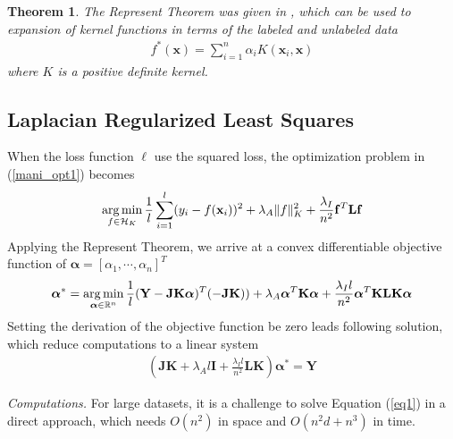 \documentclass{article}
\newcommand{\argmin}{\operatornamewithlimits{arg\,min}}
\newtheorem{theorem}{Theorem}
\begin{document}
\begin{theorem}
The Represent Theorem was given in \cite{belkin2006manifold}, which can be used to expansion of kernel functions in terms of the labeled and unlabeled data
\begin{align}\label{represent}
f^\ast(\mathbf{x})=\sum_{i=1}^n \alpha_i K(\mathbf{x}_i, \mathbf{x})
\end{align}
where $K$ is a positive definite kernel.
\end{theorem}

\subsection{Laplacian Regularized Least Squares}
When the loss function $\ell$ use the squared loss, the optimization problem in (\ref{mani_opt1}) becomes
\begin{align}\label{mani_opt2}
\argmin \limits_{f \in \mathcal{H}_K}
\frac{1}{l} \sum_{i=1}^l (y_i-f(\mathbf{x}_i))^2
+\lambda_A\|f\|_K^2
+\frac{\lambda_I }{n^2} \mathbf{f}^T \mathbf{L} \mathbf{f}
\end{align}
Applying the Represent Theorem, we arrive at a convex differentiable objective function of $\boldsymbol{\alpha}=[\alpha_1, \cdots, \alpha_n]^T$
\begin{align*}
\boldsymbol{\alpha}^\ast=\argmin \limits_{\boldsymbol{\alpha} \in \mathbb{R}^n}
\frac{1}{l} (\mathbf{Y}-\mathbf{J}\mathbf{K}\boldsymbol{\alpha})^T(-\mathbf{J}\mathbf{K}))
+\lambda_A \boldsymbol{\alpha}^T \mathbf{K} \boldsymbol{\alpha}
+\frac{\lambda_I l}{n^2} \boldsymbol{\alpha}^T \mathbf{K} \mathbf{L} \mathbf{K} \boldsymbol{\alpha}
\end{align*}
Setting the derivation of the objective function be zero leads following solution, which reduce computations to a linear system
\begin{align}\label{eq1}
(\mathbf{J}\mathbf{K}+\lambda_A l\mathbf{I}+\frac{\lambda_I l}{n^2}\mathbf{L} \mathbf{K})\boldsymbol{\alpha}^\ast=\mathbf{Y}
\end{align}

\emph{Computations.} For large datasets, it is a challenge to solve Equation (\ref{eq1}) in a direct approach,
which needs $O(n^2)$ in space and $O(n^2d+n^3)$ in time.
\end{document}
